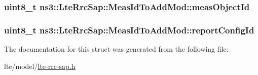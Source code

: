 \subsubsection[{\texorpdfstring{meas\+Object\+Id}{measObjectId}}]{\setlength{\rightskip}{0pt plus 5cm}uint8\+\_\+t ns3\+::\+Lte\+Rrc\+Sap\+::\+Meas\+Id\+To\+Add\+Mod\+::meas\+Object\+Id}\hypertarget{structns3_1_1LteRrcSap_1_1MeasIdToAddMod_a11682d1fb66265d671a85a8955ca2b4c}{}\label{structns3_1_1LteRrcSap_1_1MeasIdToAddMod_a11682d1fb66265d671a85a8955ca2b4c}
\subsubsection[{\texorpdfstring{report\+Config\+Id}{reportConfigId}}]{\setlength{\rightskip}{0pt plus 5cm}uint8\+\_\+t ns3\+::\+Lte\+Rrc\+Sap\+::\+Meas\+Id\+To\+Add\+Mod\+::report\+Config\+Id}\hypertarget{structns3_1_1LteRrcSap_1_1MeasIdToAddMod_a5c632512c168d74bfe312d9ab7ac88ec}{}\label{structns3_1_1LteRrcSap_1_1MeasIdToAddMod_a5c632512c168d74bfe312d9ab7ac88ec}


The documentation for this struct was generated from the following file\+:\begin{DoxyCompactItemize}
\item 
lte/model/\hyperlink{lte-rrc-sap_8h}{lte-\/rrc-\/sap.\+h}\end{DoxyCompactItemize}
